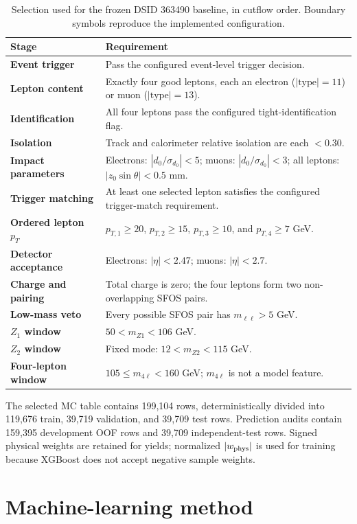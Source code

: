 \documentclass[11pt,a4paper]{article}
\begin{document}
\begin{table}[H]
\centering
\small
\caption{Selection used for the frozen DSID 363490 baseline, in cutflow order. Boundary symbols reproduce the implemented configuration.}
\begin{tabularx}{\linewidth}{>{\bfseries}p{3.2cm}X}
\toprule
Stage & Requirement\\
\midrule
Event trigger & Pass the configured event-level trigger decision.\\
Lepton content & Exactly four good leptons, each an electron ($|\mathrm{type}|=11$) or muon ($|\mathrm{type}|=13$).\\
Identification & All four leptons pass the configured tight-identification flag.\\
Isolation & Track and calorimeter relative isolation are each $<0.30$.\\
Impact parameters & Electrons: $|d_0/\sigma_{d_0}|<5$; muons: $|d_0/\sigma_{d_0}|<3$; all leptons: $|z_0\sin\theta|<0.5$ mm.\\
Trigger matching & At least one selected lepton satisfies the configured trigger-match requirement.\\
Ordered lepton $p_T$ & $p_{T,1}\geq20$, $p_{T,2}\geq15$, $p_{T,3}\geq10$, and $p_{T,4}\geq7$ GeV.\\
Detector acceptance & Electrons: $|\eta|<2.47$; muons: $|\eta|<2.7$.\\
Charge and pairing & Total charge is zero; the four leptons form two non-overlapping SFOS pairs.\\
Low-mass veto & Every possible SFOS pair has $m_{\ell\ell}>5$ GeV.\\
$Z_1$ window & $50<m_{Z1}<106$ GeV.\\
$Z_2$ window & Fixed mode: $12<m_{Z2}<115$ GeV.\\
Four-lepton window & $105\leq m_{4\ell}<160$ GeV; $m_{4\ell}$ is not a model feature.\\
\bottomrule
\end{tabularx}
\end{table}

The selected MC table contains 199,104 rows, deterministically divided into 119,676 train, 39,719 validation, and 39,709 test rows. Prediction audits contain 159,395 development OOF rows and 39,709 independent-test rows. Signed physical weights are retained for yields; normalized $|w_{\rm phys}|$ is used for training because XGBoost does not accept negative sample weights.

\section{Machine-learning method}
\end{document}
